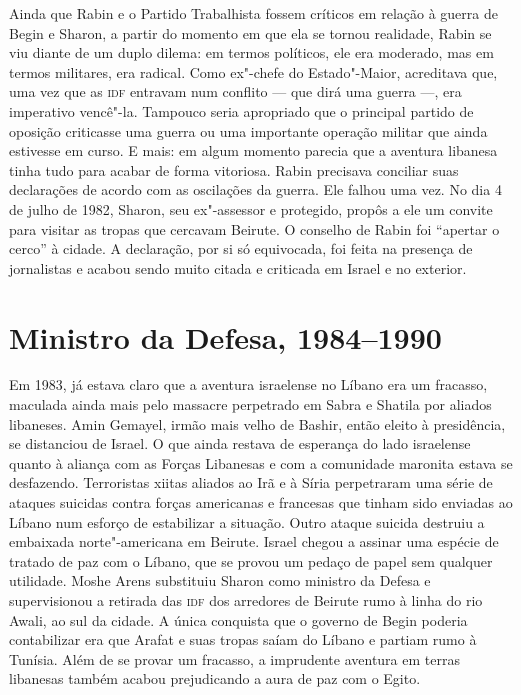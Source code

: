 Ainda que Rabin e o Partido Trabalhista fossem críticos em relação à
guerra de Begin e Sharon, a partir do momento em que ela se tornou
realidade, Rabin se viu diante de um duplo dilema: em termos políticos,
ele era moderado, mas em termos militares, era radical. Como ex"-chefe do
Estado"-Maior, acreditava que, uma vez que as \textsc{idf} entravam num conflito
--- que dirá uma guerra ---, era imperativo vencê"-la. Tampouco seria
apropriado que o principal partido de oposição criticasse uma guerra ou
uma importante operação militar que ainda estivesse em curso. E mais: em
algum momento parecia que a aventura libanesa tinha tudo para acabar de
forma vitoriosa. Rabin precisava conciliar suas declarações de acordo
com as oscilações da guerra. Ele falhou uma vez. No dia 4 de julho de
1982, Sharon, seu ex"-assessor e protegido, propôs a ele um convite para
visitar as tropas que cercavam Beirute. O conselho de Rabin foi
``apertar o cerco'' à cidade. A declaração, por si só equivocada, foi
feita na presença de jornalistas e acabou sendo muito citada e criticada
em Israel e no exterior.

\section{Ministro da Defesa, 1984--1990}

Em 1983, já estava claro que a aventura israelense no Líbano era um
fracasso, maculada ainda mais pelo massacre perpetrado em Sabra e
Shatila por aliados libaneses. Amin Gemayel, irmão mais velho de Bashir,
então eleito à presidência, se distanciou de Israel. O que ainda restava
de esperança do lado israelense quanto à aliança com as Forças
Libanesas e com a comunidade maronita estava se desfazendo. Terroristas
xiitas aliados ao Irã e à Síria perpetraram uma série de ataques
suicidas contra forças americanas e francesas que tinham sido enviadas
ao Líbano num esforço de estabilizar a situação. Outro ataque suicida
destruiu a embaixada norte"-americana em Beirute. Israel chegou a assinar
uma espécie de tratado de paz com o Líbano, que se provou um pedaço de
papel sem qualquer utilidade. Moshe Arens substituiu Sharon como
ministro da Defesa e supervisionou a retirada das \textsc{idf} dos arredores de
Beirute rumo à linha do rio Awali, ao sul da cidade. A única conquista
que o governo de Begin poderia contabilizar era que Arafat e suas
tropas saíam do Líbano e partiam rumo à Tunísia. Além de se provar um fracasso, a
imprudente aventura em terras libanesas também acabou prejudicando a
aura de paz com o Egito.

